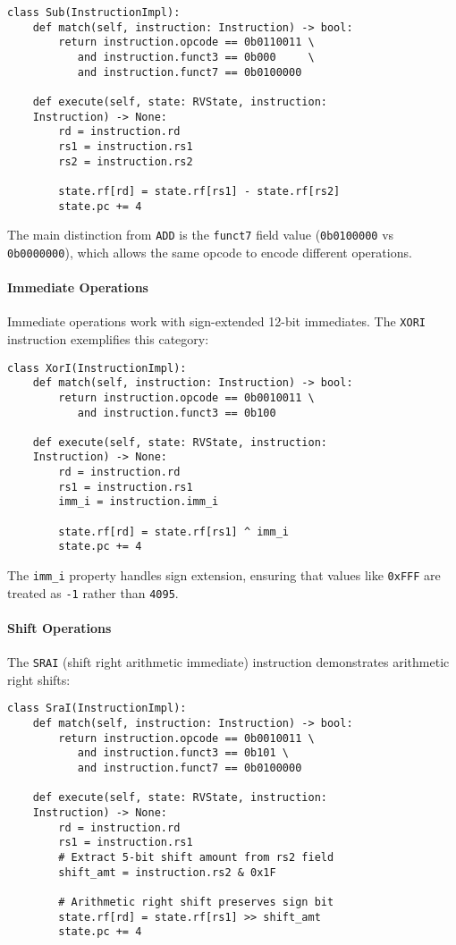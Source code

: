 \documentclass[sigconf]{acmart}
\begin{document}
\begin{verbatim}
class Sub(InstructionImpl):
    def match(self, instruction: Instruction) -> bool:
        return instruction.opcode == 0b0110011 \
           and instruction.funct3 == 0b000     \
           and instruction.funct7 == 0b0100000
    
    def execute(self, state: RVState, instruction: 
    Instruction) -> None:
        rd = instruction.rd
        rs1 = instruction.rs1
        rs2 = instruction.rs2
        
        state.rf[rd] = state.rf[rs1] - state.rf[rs2]
        state.pc += 4
\end{verbatim}

The main distinction from \texttt{ADD} is the \texttt{funct7} field value (\texttt{0b0100000} vs \texttt{0b0000000}), which allows the same opcode to encode different operations.

\paragraph{Immediate Operations}
Immediate operations work with sign-extended 12-bit immediates. The \texttt{XORI} instruction exemplifies this category:

\begin{verbatim}
class XorI(InstructionImpl):
    def match(self, instruction: Instruction) -> bool:
        return instruction.opcode == 0b0010011 \
           and instruction.funct3 == 0b100
    
    def execute(self, state: RVState, instruction: 
    Instruction) -> None:
        rd = instruction.rd
        rs1 = instruction.rs1
        imm_i = instruction.imm_i
        
        state.rf[rd] = state.rf[rs1] ^ imm_i
        state.pc += 4
\end{verbatim}

The \texttt{imm\_i} property handles sign extension, ensuring that values like \texttt{0xFFF} are treated as \texttt{-1} rather than \texttt{4095}.

\paragraph{Shift Operations}
The \texttt{SRAI} (shift right arithmetic immediate) instruction demonstrates arithmetic right shifts:

\begin{verbatim}
class SraI(InstructionImpl):
    def match(self, instruction: Instruction) -> bool:
        return instruction.opcode == 0b0010011 \
           and instruction.funct3 == 0b101 \
           and instruction.funct7 == 0b0100000
    
    def execute(self, state: RVState, instruction: 
    Instruction) -> None:
        rd = instruction.rd
        rs1 = instruction.rs1
        # Extract 5-bit shift amount from rs2 field
        shift_amt = instruction.rs2 & 0x1F
        
        # Arithmetic right shift preserves sign bit
        state.rf[rd] = state.rf[rs1] >> shift_amt
        state.pc += 4
\end{verbatim}
\end{document}
